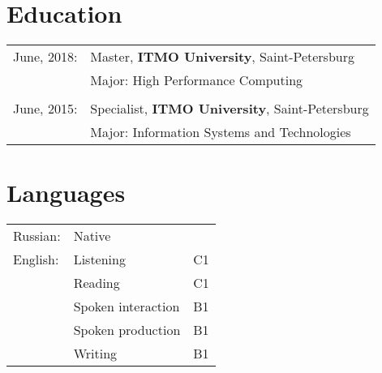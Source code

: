 \documentclass[a4paper,10pt]{article}
\begin{document}
\section{Education}
\begin{tabular}{ll}
    June, 2018:     & Master, \textbf{ITMO University}, Saint-Petersburg \\
                    & Major:  High Performance Computing \\

    \multicolumn{2}{c}{}\\

    June, 2015:     & Specialist, \textbf{ITMO University}, Saint-Petersburg \\
                    & Major:  Information Systems and Technologies
\end{tabular}

\section{Languages}
\begin{tabular}{ll|l}
    Russian:                & \multicolumn{2}{l}{Native} \\
    English\footnotemark :  & Listening             & C1 \\
                            & Reading               & C1 \\
                            & Spoken interaction    & B1 \\
                            & Spoken production     & B1 \\
                            & Writing               & B1 \\
    
\end{tabular}
\end{document}
